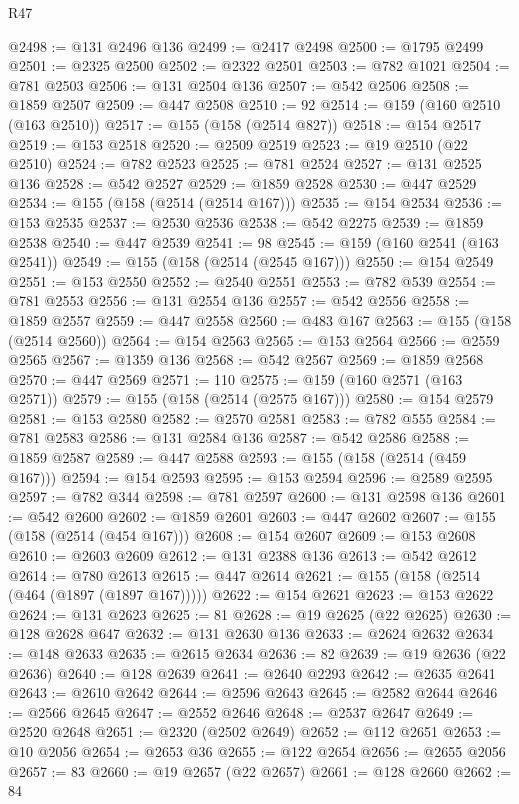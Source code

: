 \begin{lexlean}{R47}
\begin{coremodule}
@2498 := @131 @2496 @136
@2499 := @2417 @2498
@2500 := @1795 @2499
@2501 := @2325 @2500
@2502 := @2322 @2501
@2503 := @782 @1021
@2504 := @781 @2503
@2506 := @131 @2504 @136
@2507 := @542 @2506
@2508 := @1859 @2507
@2509 := @447 @2508
@2510 := 92
@2514 := @159 (@160 @2510 (@163 @2510))
@2517 := @155 (@158 (@2514 @827))
@2518 := @154 @2517
@2519 := @153 @2518
@2520 := @2509 @2519
@2523 := @19 @2510 (@22 @2510)
@2524 := @782 @2523
@2525 := @781 @2524
@2527 := @131 @2525 @136
@2528 := @542 @2527
@2529 := @1859 @2528
@2530 := @447 @2529
@2534 := @155 (@158 (@2514 (@2514 @167)))
@2535 := @154 @2534
@2536 := @153 @2535
@2537 := @2530 @2536
@2538 := @542 @2275
@2539 := @1859 @2538
@2540 := @447 @2539
@2541 := 98
@2545 := @159 (@160 @2541 (@163 @2541))
@2549 := @155 (@158 (@2514 (@2545 @167)))
@2550 := @154 @2549
@2551 := @153 @2550
@2552 := @2540 @2551
@2553 := @782 @539
@2554 := @781 @2553
@2556 := @131 @2554 @136
@2557 := @542 @2556
@2558 := @1859 @2557
@2559 := @447 @2558
@2560 := @483 @167
@2563 := @155 (@158 (@2514 @2560))
@2564 := @154 @2563
@2565 := @153 @2564
@2566 := @2559 @2565
@2567 := @1359 @136
@2568 := @542 @2567
@2569 := @1859 @2568
@2570 := @447 @2569
@2571 := 110
@2575 := @159 (@160 @2571 (@163 @2571))
@2579 := @155 (@158 (@2514 (@2575 @167)))
@2580 := @154 @2579
@2581 := @153 @2580
@2582 := @2570 @2581
@2583 := @782 @555
@2584 := @781 @2583
@2586 := @131 @2584 @136
@2587 := @542 @2586
@2588 := @1859 @2587
@2589 := @447 @2588
@2593 := @155 (@158 (@2514 (@459 @167)))
@2594 := @154 @2593
@2595 := @153 @2594
@2596 := @2589 @2595
@2597 := @782 @344
@2598 := @781 @2597
@2600 := @131 @2598 @136
@2601 := @542 @2600
@2602 := @1859 @2601
@2603 := @447 @2602
@2607 := @155 (@158 (@2514 (@454 @167)))
@2608 := @154 @2607
@2609 := @153 @2608
@2610 := @2603 @2609
@2612 := @131 @2388 @136
@2613 := @542 @2612
@2614 := @780 @2613
@2615 := @447 @2614
@2621 := @155 (@158 (@2514 (@464 (@1897 (@1897 @167)))))
@2622 := @154 @2621
@2623 := @153 @2622
@2624 := @131 @2623
@2625 := 81
@2628 := @19 @2625 (@22 @2625)
@2630 := @128 @2628 @647
@2632 := @131 @2630 @136
@2633 := @2624 @2632
@2634 := @148 @2633
@2635 := @2615 @2634
@2636 := 82
@2639 := @19 @2636 (@22 @2636)
@2640 := @128 @2639
@2641 := @2640 @2293
@2642 := @2635 @2641
@2643 := @2610 @2642
@2644 := @2596 @2643
@2645 := @2582 @2644
@2646 := @2566 @2645
@2647 := @2552 @2646
@2648 := @2537 @2647
@2649 := @2520 @2648
@2651 := @2320 (@2502 @2649)
@2652 := @112 @2651
@2653 := @10 @2056
@2654 := @2653 @36
@2655 := @122 @2654
@2656 := @2655 @2056
@2657 := 83
@2660 := @19 @2657 (@22 @2657)
@2661 := @128 @2660
@2662 := 84

\end{coremodule}
\end{lexlean}
